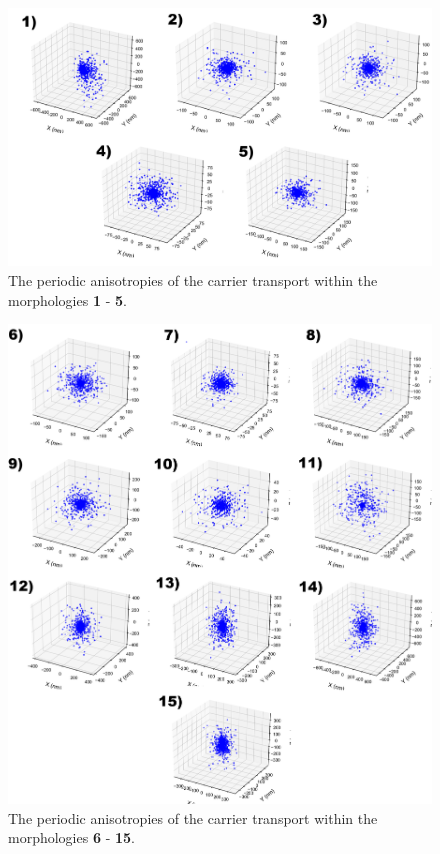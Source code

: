 \documentclass[12pt]{article}
\begin{document}
\begin{figure}[h!]\centering
	\includegraphics[width=\textwidth]{Figures/anisotropyHole.png}
    \caption{The periodic anisotropies of the carrier transport within the morphologies \textbf{1} - \textbf{5}.}
	\label{fig:Anis}
\end{figure}

\begin{figure}[h!]\centering
	\includegraphics[width=\textwidth]{Figures/anisotropyHoleFrame.png}
    \caption{The periodic anisotropies of the carrier transport within the morphologies \textbf{6} - \textbf{15}.}
	\label{fig:AnisFrame}
\end{figure}
\end{document}
